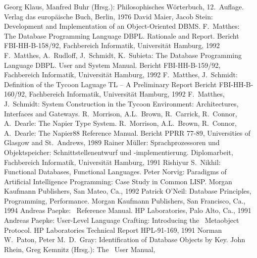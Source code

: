 \begin{thebibliography}{Stonebraker \etal\ 86a}
Georg Klaus, Manfred Buhr (Hrsg.):
Philosophisches W\"{o}rterbuch,
12.~Auf\-la\-ge.
Verlag das europ\"{a}ische Buch, Berlin, 1976
%
David Maier, Jacob Stein:
Development and Implementation of an Object-Oriented DBMS.
%
%
%
F.\ Matthes:
The Database Programming Language DBPL.
Rationale and Report.
Bericht FBI-HH-B-158/92,
Fachbereich Informatik, Universit\"{a}t Hamburg,
1992
%
F.\ Matthes, A.\ Rudloff, J.\ Schmidt, K.\ Subieta:
The Database Programming Language DBPL.
User and System Manual.
Bericht FBI-HH-B-159/92,
Fachbereich Informatik, Universit\"{a}t Hamburg,
1992
%
F.\ Matthes, J.\ Schmidt:
Definition of the Tycoon Laguage TL -- A Preliminary Report
Bericht FBI-HH-B-160/92,
Fachbereich Informatik, Universit\"{a}t Hamburg,
1992
%
F.\ Matthes, J.\ Schmidt:
System Construction in the Tycoon Environment:
Architectures, Interfaces and Gateways.
%
R.\ Morrison, A.L.\ Brown, R.\ Carrick, R.\ Connor, A.\ Dearle:
The Napier Type System.
%
R.\ Morrison, A.L.\ Brown, R.\ Connor, A.\ Dearle:
The Napier88 Reference Manual.
Bericht PPRR 77-89, Universities of Glasgow and St.\ Andrews, 1989
%
Rainer M\"{u}ller:
Sprachprozessoren und Objektspeicher:
Schnittstellenentwurf und -implementierung.
Diplomarbeit,
Fachbereich Informatik, Universit\"{a}t Hamburg,
1991
%
Rishiyur S.\ Nikhil:
Functional Databases, Functional Languages.
%
Peter Norvig:
Paradigms of Artificial Intelligence Programming:
Case Study in Common LISP.
Morgan Kaufmann Publishers, San Mateo, Ca., 1992
%
Patrick O'Neil:
Database Principles, Programming, Performance.
Morgan Kaufmann Publishers, San Francisco, Ca., 1994
%
Andreas Paepke:
\pclos\ Reference Manual.
HP Laboratories, Palo Alto, Ca., 1991
%
Andreas Paepke:
User-Level Language Crafting:
Introducing the \clos\ Metaobject Protocol.
HP Laboratories Technical Report HPL-91-169, 1991
%
Norman W.\ Paton, Peter M.\ D.\ Gray:
Identification of Database Objects by Key.
%
John Rhein, Greg Kemnitz (Hrsg.):
The \postgres\ User Manual,

\end{thebibliography}
